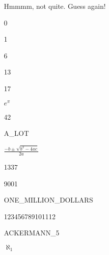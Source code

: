 Hmmmm, not quite. Guess again!

\begin{switch}
\item{0}
\item{1}
\item{6}
\item{13}
\item{17}
\item{$e^\pi$}
\item{42}
\item{A\_LOT}
\item{$\frac{-b \pm \sqrt{b^2 - 4ac}}{2a}$}
\item{1337}
\item{9001}
\item{ONE\_MILLION\_DOLLARS}
\item{123456789101112}
\item{ACKERMANN\_5}
\item{$\aleph_1$}
\end{switch}


